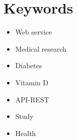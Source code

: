 \chapter*{Keywords}

\begin{itemize}
    \item Web service
    \item Medical research
    \item Diabetes
    \item Vitamin D
    \item API-REST
    \item Study
    \item Health
\end{itemize}
